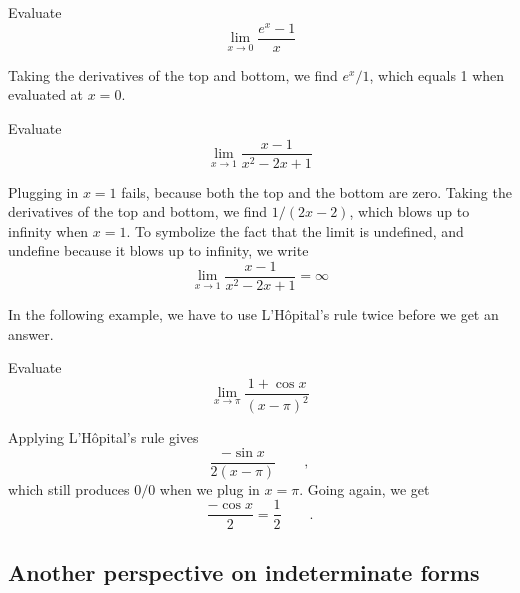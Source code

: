\begin{eg}
\egquestion Evaluate
\begin{equation*}
  \lim_{x\rightarrow 0} \frac{e^x-1}{x}
\end{equation*}

\eganswer Taking the derivatives of the top and bottom, we find $e^x/1$, which equals 1 when
evaluated at $x=0$.
\end{eg}

\begin{eg}
\egquestion Evaluate
\begin{equation*}
  \lim_{x\rightarrow 1} \frac{x-1}{x^2-2x+1}
\end{equation*}

\eganswer Plugging in $x=1$ fails, because both the top and the bottom are zero.
Taking the derivatives of the top and bottom, we find $1/(2x-2)$, which blows up to
infinity when $x=1$. To symbolize the fact that
the limit is undefined, and undefine because it blows up to infinity, we write
\begin{equation*}
  \lim_{x\rightarrow 1} \frac{x-1}{x^2-2x+1} = \infty
\end{equation*}
\end{eg}

\pagebreak[4]

In the following example, we have to use L'H\^{o}pital's rule twice before we get an answer.

\begin{eg}
\egquestion Evaluate
\begin{equation*}
  \lim_{x\rightarrow \pi} \frac{1+\cos x}{(x-\pi)^2}
\end{equation*}

\eganswer Applying  L'H\^{o}pital's rule gives
\begin{equation*}
  \frac{-\sin x}{2(x-\pi)} \qquad ,
\end{equation*}
which still produces $0/0$ when we plug in $x=\pi$. Going again, we get
\begin{equation*}
  \frac{-\cos x}{2} = \frac{1}{2} \qquad .
\end{equation*}
\end{eg}

\subsection{Another perspective on indeterminate forms}

